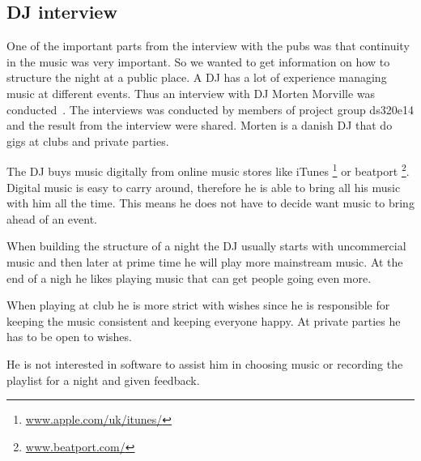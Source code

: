 \subsection{DJ interview}
One of the important parts from the interview with the pubs was that continuity in the music was very important. So we wanted to get information on how to structure the night at a public place. A DJ has a lot of experience managing music at different events. Thus an interview with DJ Morten Morville was conducted~\cite{int_dj}. The interviews was conducted by members of project group ds320e14 and the result from the interview were shared. Morten is a danish DJ that do gigs at clubs and private parties.

The DJ buys music digitally from online music stores like iTunes \footnote{\url{www.apple.com/uk/itunes/}} or beatport \footnote{\url{www.beatport.com/}}. Digital music is easy to carry around, therefore he is able to bring all his music with him all the time. This means he does not have to decide want music to bring ahead of an event. 

When building the structure of a night the DJ usually starts with uncommercial music and then later at prime time he will play more mainstream music. At the end of a nigh he likes playing music that can get people going even more.

When playing at club he is more strict with wishes since he is responsible for keeping the music consistent and keeping everyone happy. At private parties he has to be open to wishes.

He is not interested in software to assist him in choosing music or recording the playlist for a night and given feedback.
